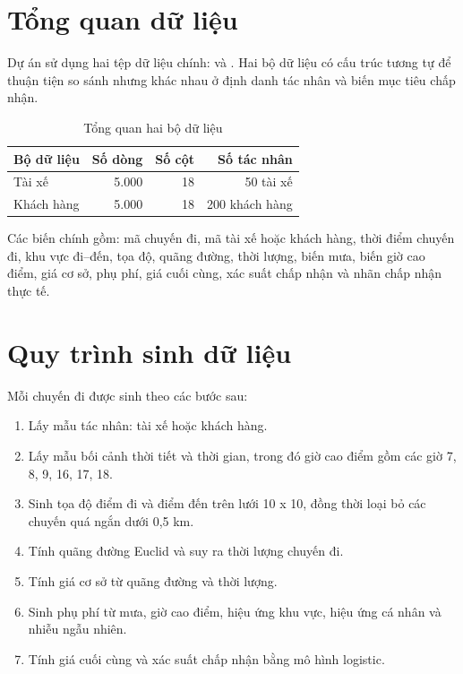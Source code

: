 \documentclass[12pt,a4paper]{report}
\begin{document}
\section{Tổng quan dữ liệu}

Dự án sử dụng hai tệp dữ liệu chính:  và . Hai bộ dữ liệu có cấu trúc tương tự để thuận tiện so sánh nhưng khác nhau ở định danh tác nhân và biến mục tiêu chấp nhận.

\begin{table}[H]
\centering
\caption{Tổng quan hai bộ dữ liệu}
\begin{tabular}{lrrr}
\toprule
\textbf{Bộ dữ liệu} & \textbf{Số dòng} & \textbf{Số cột} & \textbf{Số tác nhân} \\
\midrule
Tài xế & 5.000 & 18 & 50 tài xế \\
Khách hàng & 5.000 & 18 & 200 khách hàng \\
\bottomrule
\end{tabular}
\end{table}

Các biến chính gồm: mã chuyến đi, mã tài xế hoặc khách hàng, thời điểm chuyến đi, khu vực đi--đến, tọa độ, quãng đường, thời lượng, biến mưa, biến giờ cao điểm, giá cơ sở, phụ phí, giá cuối cùng, xác suất chấp nhận và nhãn chấp nhận thực tế.

\section{Quy trình sinh dữ liệu}

Mỗi chuyến đi được sinh theo các bước sau:

\begin{enumerate}
    \item Lấy mẫu tác nhân: tài xế hoặc khách hàng.
    \item Lấy mẫu bối cảnh thời tiết và thời gian, trong đó giờ cao điểm gồm các giờ 7, 8, 9, 16, 17, 18.
    \item Sinh tọa độ điểm đi và điểm đến trên lưới 10 x 10, đồng thời loại bỏ các chuyến quá ngắn dưới 0,5 km.
    \item Tính quãng đường Euclid và suy ra thời lượng chuyến đi.
    \item Tính giá cơ sở từ quãng đường và thời lượng.
    \item Sinh phụ phí từ mưa, giờ cao điểm, hiệu ứng khu vực, hiệu ứng cá nhân và nhiễu ngẫu nhiên.
    \item Tính giá cuối cùng và xác suất chấp nhận bằng mô hình logistic.
\end{enumerate}
\end{document}
